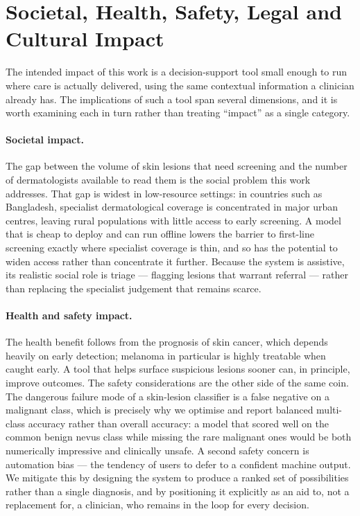 \section{Societal, Health, Safety, Legal and Cultural Impact}
\label{sec:impacts}

The intended impact of this work is a decision-support tool small enough to
run where care is actually delivered, using the same contextual information a
clinician already has. The implications of such a tool span several
dimensions, and it is worth examining each in turn rather than treating
``impact'' as a single category.

\paragraph{Societal impact.}
The gap between the volume of skin lesions that need screening and the number
of dermatologists available to read them is the social problem this work
addresses. That gap is widest in low-resource settings: in countries such as
Bangladesh, specialist dermatological coverage is concentrated in major urban
centres, leaving rural populations with little access to early screening. A
model that is cheap to deploy and can run offline lowers the barrier to
first-line screening exactly where specialist coverage is thin, and so has the
potential to widen access rather than concentrate it further. Because the
system is assistive, its realistic social role is triage --- flagging lesions
that warrant referral --- rather than replacing the specialist judgement that
remains scarce.

\paragraph{Health and safety impact.}
The health benefit follows from the prognosis of skin cancer, which depends
heavily on early detection; melanoma in particular is highly treatable when
caught early. A tool that helps surface suspicious lesions sooner can, in
principle, improve outcomes. The safety considerations are the other side of
the same coin. The dangerous failure mode of a skin-lesion classifier is a
false negative on a malignant class, which is precisely why we optimise and
report balanced multi-class accuracy rather than overall accuracy: a model
that scored well on the common benign nevus class while missing the rare
malignant ones would be both numerically impressive and clinically unsafe. A
second safety concern is automation bias --- the tendency of users to defer to
a confident machine output. We mitigate this by designing the system to
produce a ranked set of possibilities rather than a single diagnosis, and by
positioning it explicitly as an aid to, not a replacement for, a clinician,
who remains in the loop for every decision.

